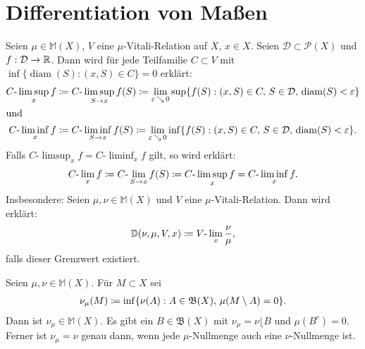 \documentclass[a4paper,twoside,DIV15,BCOR12mm]{scrbook}
\newcommand{\borel}{\mathfrak B}
\DeclareMathOperator{\diam}{diam}
\DeclareMathOperator{\downto}{\searrow}
\newcommand{\MR}{\lfloor}
\begin{document}
\section{Differentiation von Maßen}

\begin{definition}
Seien $\mu\in\mathbb{M} (X)$, $V$ eine $\mu$-Vitali-Relation auf $X$, $x\in X$. Seien $\mathcal{D}\subset \mathcal P(X)$ und $f:\mathcal D\to \mathbb{R}$. Dann wird für jede Teilfamilie $C\subset V$ mit $\inf\{\diam(S): (x,S)\in C\}=0$ erklärt:
\begin{align*}
C\text{-}\limsup_x f &\da C\text{-}\limsup_{S\to x} f(S) \da
\lim_{\ep\downto 0} \sup\{f(S):(x,S)\in C,\, S\in\mathcal D,\, \diam(S)<\ep\}\\
\intertext{und}
C\text{-}\liminf_x f &\da C\text{-}\liminf_{S\to x} f(S) \da
\lim_{\ep \downto0} \inf\{f(S):(x,S)\in C,\, S\in\mathcal D,\, \diam(S)<\ep\}.
\end{align*}
Falls $C\text{-}\limsup_x f = C\text{-}\liminf_x f$ gilt, so wird erklärt:
\begin{align*}
C\text{-}\lim_x f \da C\text{-}\lim_{S\to x} f(S)\da C\text{-}\limsup_x f = C\text{-}\liminf_x f.
\end{align*}
Insbesondere: Seien $\mu,\nu\in\mathbb M(X)$ und $V$ eine $\mu$-Vitali-Relation. Dann wird erklärt:
\begin{align*}
\mathbb D(\nu,\mu,V,x) \da V\text{-}\lim_x \frac\nu\mu,
\end{align*}
falls dieser Grenzwert existiert.
\end{definition}

\begin{satz}
\label{satz:2.10}
Seien $\mu,\nu\in\mathbb{M}(X)$. Für $M\subset X$ sei
\begin{align*}
\nu_\mu(M) \da \inf\{\nu(A) : A\in \borel(X),\, \mu(M\setminus A) =0 \}.
\end{align*}
Dann ist $\nu_\mu\in\mathbb{M} (X)$. Es gibt ein $B\in\borel(X)$ mit $\nu_\mu = \nu\MR B$ und $\mu(B^c) = 0$. Ferner ist $\nu_\mu=\nu$ genau dann, wenn jede $\mu$-Nullmenge auch eine $\nu$-Nullmenge ist.
\end{satz}
\end{document}
